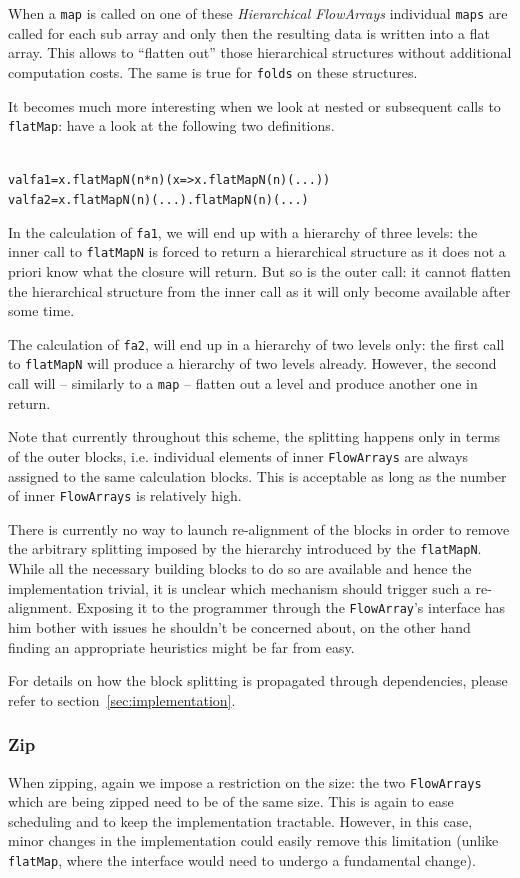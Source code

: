 \documentclass[runningheads,a4paper,fleqn]{llncs}
\begin{document}
When a \texttt{map} is called on one of these \emph{Hierarchical
  FlowArrays} individual \texttt{maps} are called for each sub array
and only then the resulting data is written into a flat array. This
allows to ``flatten out'' those hierarchical structures without
additional computation costs. The same is true for \texttt{folds} on
these structures.

It becomes much more interesting when we look at nested or subsequent
calls to \texttt{flatMap}: have a look at the following two
definitions.
\begin{alltt}
{\scriptsize
val fa1 = x.flatMapN(n*n)(x => x.flatMapN(n)( ... ))
val fa2 = x.flatMapN(n)(...).flatMapN(n)(...)
}
\end{alltt}
In the calculation of \texttt{fa1}, we will end up with a hierarchy of
three levels: the inner call to \texttt{flatMapN} is forced to return
a hierarchical structure as it does not a priori know what the closure
will return. But so is the outer call: it cannot flatten the hierarchical
structure from the inner call as it will only become available after
some time.

The calculation of \texttt{fa2}, will end up in a hierarchy of
two levels only: the first call to \texttt{flatMapN} will produce a 
hierarchy of two levels already. However, the second call will --
similarly to a \texttt{map} -- flatten out a level and produce another
one in return.

Note that currently throughout this scheme, the splitting happens only
in terms of the outer 
blocks, i.e. individual elements of inner \texttt{FlowArrays} are always
assigned to the same calculation blocks. This is acceptable as long as
the number of inner \texttt{FlowArrays} is relatively high.

There is currently no way to launch re-alignment of the blocks
in order to remove the arbitrary splitting imposed by the hierarchy
introduced by the \texttt{flatMapN}. While all the necessary building
blocks to do so are available and hence the implementation trivial, it
is unclear which mechanism should trigger such a
re-alignment. Exposing it to the programmer through the
\texttt{FlowArray}'s interface has him bother with issues he shouldn't
be concerned about, on the other hand finding an appropriate
heuristics might be far from easy.

For details on how the block splitting is
propagated through dependencies, please refer to
section~\ref{sec:implementation}.

\subsubsection{Zip}
When zipping, again we impose a restriction on the size: 
the two \texttt{FlowArrays} which are being zipped need to be of the same
size. This is again to ease scheduling and to keep the implementation
tractable. However, in 
this case, minor changes in the implementation could easily remove
this limitation (unlike \texttt{flatMap}, where the interface would
need to undergo a fundamental change).
\end{document}
